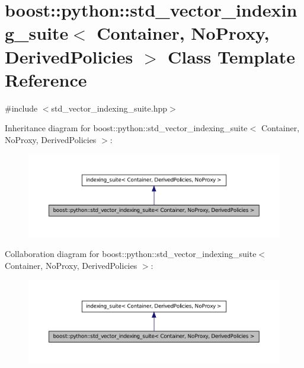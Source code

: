 \hypertarget{classboost_1_1python_1_1std__vector__indexing__suite}{\section{boost\-:\-:python\-:\-:std\-\_\-vector\-\_\-indexing\-\_\-suite$<$ \-Container, \-No\-Proxy, \-Derived\-Policies $>$ \-Class \-Template \-Reference}
\label{classboost_1_1python_1_1std__vector__indexing__suite}
}


{\ttfamily \#include $<$std\-\_\-vector\-\_\-indexing\-\_\-suite.\-hpp$>$}



\-Inheritance diagram for boost\-:\-:python\-:\-:std\-\_\-vector\-\_\-indexing\-\_\-suite$<$ \-Container, \-No\-Proxy, \-Derived\-Policies $>$\-:\nopagebreak
\begin{figure}[H]
\begin{center}
\leavevmode
\includegraphics[width=350pt]{classboost_1_1python_1_1std__vector__indexing__suite__inherit__graph}
\end{center}
\end{figure}


\-Collaboration diagram for boost\-:\-:python\-:\-:std\-\_\-vector\-\_\-indexing\-\_\-suite$<$ \-Container, \-No\-Proxy, \-Derived\-Policies $>$\-:\nopagebreak
\begin{figure}[H]
\begin{center}
\leavevmode
\includegraphics[width=350pt]{classboost_1_1python_1_1std__vector__indexing__suite__coll__graph}
\end{center}
\end{figure}
